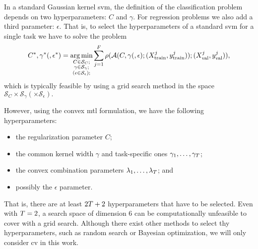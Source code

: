 %
In a standard Gaussian kernel \acrshort{svm}, the definition of the classification problem depends on two hyperparameters: $C$ and $\gamma$.
For regression problems we also add a third parameter: $\epsilon$. 
That is, to select the hyperparameters of a standard \acrshort{svm} for a single task we have to solve the problem
\begin{equation}
    \nonumber
    C^*, \gamma^* (, \epsilon^*) = \operatorname*{arg\min}_{\substack{C \in \mathcal{S}_C ; \\ \substack{\gamma \in \mathcal{S}_\gamma} ; \\ \left(\substack{\epsilon \in \mathcal{S}_\epsilon} \right); }}
     \sum_{j=1}^{F} \rho(\mathcal{A}(C, \gamma (, \epsilon); (X^j_\text{train}, y^j_\text{train})); (X^j_\text{val}, y^j_\text{val})) ,
\end{equation}
which is typically feasible by using a grid search method in the space $\mathcal{S}_{C} \times \mathcal{S}_{\gamma} (\times \mathcal{S}_{\epsilon}) .$
%

However, using the convex \acrshort{mtl} formulation, 
we have the following hyperparameters: 
\begin{itemize}
    \item the regularization parameter $C$;
    \item the common kernel width $\gamma$ and task-specific ones $\gamma_1, \ldots, \gamma_T$;
    \item the convex combination parameters $\lambda_1, \ldots, \lambda_T$; and
    \item possibly the $\epsilon$ parameter.
\end{itemize}
That is, there are at least $2T + 2$ hyperparameters that have to be selected. Even with $T=2$, a search space of dimension $6$ can be computationally unfeasible to cover with a grid search. Although there exist other methods to select thy hyperparameters, such as random search or Bayesian optimization, we will only consider \acrshort{cv} in this work.

